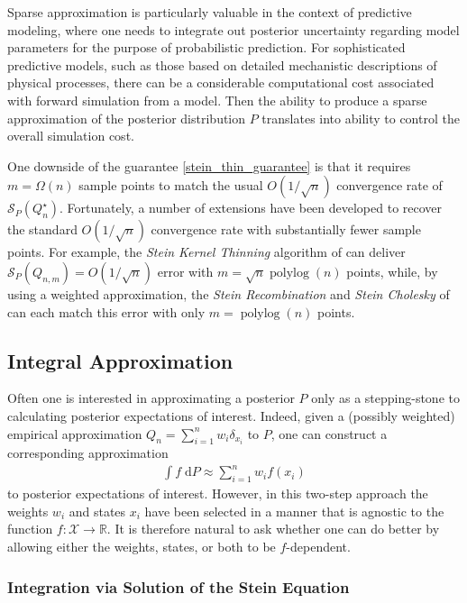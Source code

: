 \documentclass[12pt,paper=letter]{scrreprt}
\def\polylog{\operatorname{polylog}}
\begin{document}
Sparse approximation is particularly valuable in the context of predictive modeling, where one needs to integrate out posterior uncertainty regarding model parameters for the purpose of probabilistic prediction.
For sophisticated predictive models, such as those based on detailed mechanistic descriptions of physical processes, there can be a considerable computational cost associated with forward simulation from a model.
Then the ability to produce a sparse approximation of the posterior distribution $P$ translates into ability to control the overall simulation cost.

One downside of the guarantee \eqref{stein_thin_guarantee} is that it requires $m=\Omega(n)$ sample points to match the usual $O(1/\sqrt{n})$ convergence rate of $\mathcal{S}_P(Q_n^\star)$. Fortunately, a number of extensions have been developed to recover the standard $O(1/\sqrt{n})$ convergence rate with substantially fewer sample points. For example, the \emph{Stein Kernel Thinning} algorithm of \citet{li2024debiased} can deliver $\mathcal{S}_P(Q_{n,m}) = O(1/\sqrt{n})$ error with $m = \sqrt{n} \polylog(n)$ points, while, by using a weighted approximation, the \emph{Stein Recombination} and \emph{Stein Cholesky} of \citet{li2024debiased} can each match this error with only $m=\polylog(n)$ points.






\subsection{Integral Approximation}
\label{subsec: control variates}

Often one is interested in approximating a posterior $P$ only as a stepping-stone to calculating posterior expectations of interest.
Indeed, given a (possibly weighted) empirical approximation $Q_n = \sum_{i=1}^n w_i \delta_{x_i}$ to $P$, one can construct a corresponding approximation
\begin{align}
    \int f \; \mathrm{d}P \approx \sum_{i=1}^n w_i f(x_i) \label{eq: cubature}
\end{align}
to posterior expectations of interest.
However, in this two-step approach the weights $w_i$ and states $x_i$ have been selected in a manner that is agnostic to the function $f : \mathcal{X} \rightarrow \mathbb{R}$.
It is therefore natural to ask whether one can do better by allowing either the weights, states, or both to be $f$-dependent.

\subsubsection*{Integration via Solution of the Stein Equation}
\end{document}
